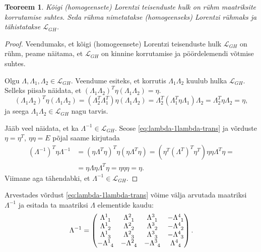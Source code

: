 \documentclass[12pt]{article}
\theoremstyle{plain}
\newtheorem{teoreem}{Teoreem}[section]
\theoremstyle{definition}
\numberwithin{equation}{section}
\def\L{{\mathcal L}}
\begin{document}
\begin{teoreem}
Kõigi (homogeensete) Lorentzi teisenduste hulk on rühm maatriksite 
korrutamise suhtes. Seda rühma nimetatakse \emph{(homogeenseks) 
Lorentzi rühmaks} ja tähistatakse $\L_{GH}$.
\end{teoreem}

\begin{proof}
Veendumaks, et kõigi (homogeensete) Lorentzi teisenduste hulk 
$\L_{GH}$ on rühm, peame näitama, et $\L_{GH}$ on kinnine korrutamise 
ja pöörd\-elemendi võtmise suhtes.

Olgu $\Lambda, \Lambda_1, \Lambda_2 \in \L_{GH}$. Veendume esiteks, 
et korrutis $\Lambda_1 \Lambda_2$ kuulub hulka $\L_{GH}$. Selleks 
piisab näidata, et $\left(\Lambda_1 \Lambda_2\right)^T \eta 
\left(\Lambda_1 \Lambda_2\right) = \eta$.
\begin{equation*}
\left(\Lambda_1 \Lambda_2\right)^T \eta 
\left(\Lambda_1 \Lambda_2\right) = 
\left(\Lambda_2^T \Lambda_1^T\right) \eta 
\left(\Lambda_1 \Lambda_2\right) = \Lambda_2^T 
\left(\Lambda_1^T \eta \Lambda_1 \right) \Lambda_2 = 
\Lambda_2^T \eta \Lambda_2 = \eta,
\end{equation*}
ja seega $\Lambda_1 \Lambda_2 \in \L_{GH}$ nagu tarvis.

Jääb veel näidata, et ka $\Lambda^{-1 } \in \L_{GH}$. Seose 
\ref{eq:lambda-1lambda-trans} ja võrduste $\eta = \eta^T$, 
$\eta \eta = E$ põjal saame kirjutada
\begin{align*}
\left(\Lambda^{-1}\right)^T \eta \Lambda^{-1} &= 
\left(\eta \Lambda^T \eta \right)^T \eta 
\left(\eta \Lambda^T \eta\right) = 
\left(\eta^T \left(\Lambda^T\right)^T \eta^T \right) 
\eta \eta \Lambda^T \eta = \\
&= \eta \Lambda \eta \Lambda^T \eta = \eta \eta \eta = \eta.
\end{align*}
Viimane aga tähendabki, et $\Lambda^{-1} \in \L_{GH}$.
\end{proof}

Arvestades võrdust \ref{eq:lambda-1lambda-trans} võime välja 
arvutada maatriksi $\Lambda^{-1}$ ja esitada ta maatriksi $\Lambda$ 
elementide kaudu:
\[\Lambda^{-1} = \begin{pmatrix}
\Lambda\indices{^1_1} & \Lambda\indices{^2_1} & 
	\Lambda\indices{^3_1} & -\Lambda\indices{^4_1} \\ 
\Lambda\indices{^1_2} & \Lambda\indices{^2_2} & 
	\Lambda\indices{^3_2} & -\Lambda\indices{^4_2} \\  
\Lambda\indices{^1_3} & \Lambda\indices{^2_3} & 
	\Lambda\indices{^3_3} & -\Lambda\indices{^4_3} \\ 
-\Lambda\indices{^1_4} & -\Lambda\indices{^2_4} & 
	-\Lambda\indices{^3_4} & \Lambda\indices{^4_4} \\ 
\end{pmatrix}.\]
\end{document}
